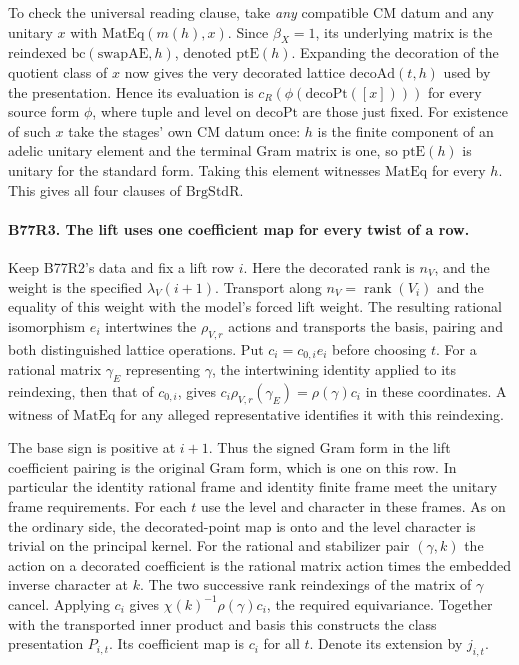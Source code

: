 To check the universal reading clause, take \emph{any} compatible
CM datum and any unitary $x$ with $\mathrm{MatEq}(m(h),x)$.
Since $\beta_X=1$, its underlying matrix is the reindexed
$\mathrm{bc}(\mathrm{swapAE},h)$, denoted $\mathrm{ptE}(h)$.
Expanding the decoration of the quotient class of $x$ now gives
the very decorated lattice $\mathrm{decoAd}(t,h)$ used by the
presentation. Hence its evaluation is
$c_R(\phi(\mathrm{decoPt}([x])))$ for every source form $\phi$,
where tuple and level on $\mathrm{decoPt}$ are those just fixed.
For existence of such $x$ take the stages' own CM datum once:
$h$ is the finite component of an adelic unitary element and the
terminal Gram matrix is one, so $\mathrm{ptE}(h)$ is unitary for
the standard form. Taking this element witnesses $\mathrm{MatEq}$
for every $h$. This gives all four clauses of $\mathrm{BrgStdR}$.

\paragraph{B77R3. The lift uses one coefficient map for every twist of a row.}
Keep B77R2's data and fix a lift row $i$. Here the decorated rank
is $n_V$, and the weight is the specified $\lambda_V(i+1)$.
Transport along $n_V=\operatorname{rank}(V_i)$ and the equality
of this weight with the model's forced lift weight. The resulting
rational isomorphism $e_i$ intertwines the $\rho_{V,r}$ actions
and transports the basis, pairing and both distinguished lattice
operations. Put $c_i=c_{0,i}e_i$ before choosing $t$.
For a rational matrix $\gamma_E$ representing $\gamma$, the
intertwining identity applied to its reindexing, then that of
$c_{0,i}$, gives $c_i\rho_{V,r}(\gamma_E)=\rho(\gamma)c_i$ in
these coordinates. A witness of $\mathrm{MatEq}$ for any alleged
representative identifies it with this reindexing.

The base sign is positive at $i+1$. Thus the signed Gram form
in the lift coefficient pairing is the original Gram form, which
is one on this row. In particular the identity rational frame
and identity finite frame meet the unitary frame requirements.
For each $t$ use the level and character in these frames. As on
the ordinary side, the decorated-point map is onto and the
level character is trivial on the principal kernel. For the
rational and stabilizer pair $(\gamma,k)$ the action on a
decorated coefficient is the rational matrix action times the
embedded inverse character at $k$. The two successive rank
reindexings of the matrix of $\gamma$ cancel. Applying $c_i$
gives $\chi(k)^{-1}\rho(\gamma)c_i$, the required equivariance.
Together with the transported inner product and basis this
constructs the class presentation $P_{i,t}$. Its coefficient
map is $c_i$ for all $t$. Denote its extension by $j_{i,t}$.

